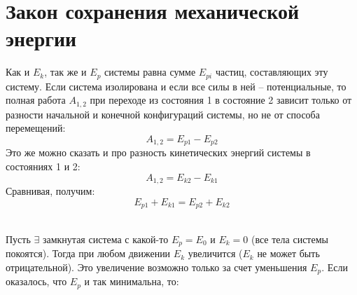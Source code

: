 \section{Закон сохранения механической энергии}

Как и $E_k$, так же и $E_p$ системы равна сумме $E_{pi}$ частиц, составляющих эту систему. Если система изолирована и если все силы в ней -- потенциальные, то полная работа $A_{1,2}$ при переходе из состояния 1 в состояние 2 зависит только от разности начальной и конечной конфигураций системы, но не от способа перемещений:
   \begin{displaymath}
   A_{1,2}=E_{p1}-E_{p2}
   \end{displaymath}
Это же можно сказать и про разность кинетических энергий системы в состояниях 1 и 2:
   \begin{displaymath}
   A_{1,2}=E_{k2}-E_{k1}
   \end{displaymath}
Сравнивая, получим:
   \begin{displaymath}
   E_{p1}+E_{k1}=E_{p2}+E_{k2}
   \end{displaymath}

\\[2mm]

Пусть $\exists$ замкнутая система с какой-то $E_p=E_0$ и $E_k=0$ (все тела системы покоятся). Тогда при любом движении $E_k$ увеличится ($E_k$ не может быть отрицательной). Это увеличение возможно только за счет уменьшения $E_p$. Если оказалось, что $E_p$ и так минимальна, то: \\

\\[2mm]

